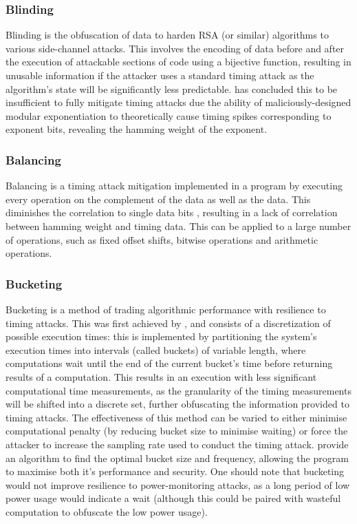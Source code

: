 \documentclass[british,10pt,a4paper]{article}
\begin{document}
\subsubsection{Blinding}
Blinding is the obfuscation of data to harden RSA (or similar) algorithms to various side-channel attacks. This involves the encoding of data before and after the execution of attackable sections of code using a bijective function,
resulting in unusable information if the attacker uses a standard timing attack as the algorithm's state will be significantly less predictable. \citet{kocher96timing} has concluded this to be insufficient to fully mitigate timing attacks due the ability of maliciously-designed modular exponentiation to theoretically cause timing spikes corresponding to exponent bits, revealing the hamming weight of the exponent.

\subsubsection{Balancing}
Balancing is a timing attack mitigation implemented in a program by executing every operation on the complement of the data as well as the data. This diminishes the correlation to single data bits \cite{daemen-implementattacks}, resulting in a lack of correlation between hamming weight and timing data. This can be applied to a large number of operations, such as fixed offset shifts, bitwise operations and arithmetic operations.

\subsubsection{Bucketing}
Bucketing is a method of trading algorithmic performance with resilience to timing attacks. This was first achieved by \citet{Kopf2009-mh}, and consists of a discretization of possible execution times: this is implemented by partitioning the system's execution times into intervals (called buckets) of variable length, where computations wait until the end of the current bucket's time before returning results of a computation. This results in an execution with less significant computational time measurements, as the granularity of the timing measurements will be shifted into a discrete set, further obfuscating the information provided to timing attacks. The effectiveness of this method can be varied to either minimise computational penalty (by reducing bucket size to minimise waiting) or force the attacker to increase the sampling rate used to conduct the timing attack. \citeauthor{Kopf2009-mh} provide an algorithm to find the optimal bucket size and frequency, allowing the program to maximise both it's performance and security. One should note that bucketing would not improve resilience to power-monitoring attacks, as a long period of low power usage would indicate a wait (although this could be paired with wasteful computation to obfuscate the low power usage).
\end{document}
